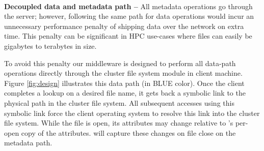 ~\\
\textbf{Decoupled data and metadata path -- }
All metadata operations go through the \giga{} server; however, following the
same path for data operations would incur an unnecessary performance penalty 
of shipping data over the network on extra time. 
This penalty can be significant in HPC use-cases where files can easily be  
gigabytes to terabytes in size.

To avoid this penalty our middleware is designed to perform all
data-path operations directly through the cluster file system module in client
machine. 
Figure \ref{fig:design} illustrates this data path (in BLUE color).
Once the client completes a
lookup on a desired file name, it gets back a symbolic link to the physical
path in the cluster file system. All subsequent accesses using this symbolic
link force the client operating system to resolve this link into the cluster
file system.
While the file is open, its attributes may change relative to \ldb's per-open
copy of the attributes. \giga will capture these changes on file close on the
metadata path.



